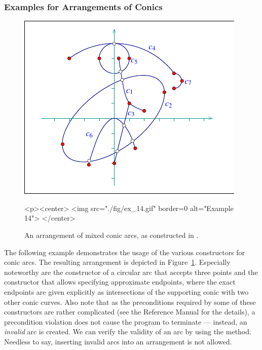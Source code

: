 \subsubsection{Examples for Arrangements of Conics}

\begin{figure}[t]
\begin{ccTexOnly}
  \begin{center}
  \includegraphics{Arrangement_2/fig/ex_14}
  \end{center}
\end{ccTexOnly}
\begin{ccHtmlOnly}
  <p><center>
  <img src="./fig/ex_14.gif" border=0 alt="Example 14">
  </center>
\end{ccHtmlOnly}
\caption{An arrangement of mixed conic arcs, as constructed in
.\label{arr_fig:ex_14}}
\end{figure}

The following example demonstrates the usage of the various
constructors for conic arcs. The resulting arrangement is depicted
in Figure~\ref{arr_fig:ex_14}. Especially noteworthy are the
constructor of a circular arc that accepts three points and the
constructor that allows specifying approximate endpoints, where the
exact endpoints are given explicitly as intersections of
the supporting conic with two other conic curves. Also note that as the
preconditions required by some of these constructors are rather
complicated (see the Reference Manual for the details), a
precondition violation does not cause the program to terminate ---
instead, an {\em invalid} arc is created. We can verify the validity
of an arc by using the  method. Needless to say, inserting
invalid arcs into an arrangement is not allowed.

